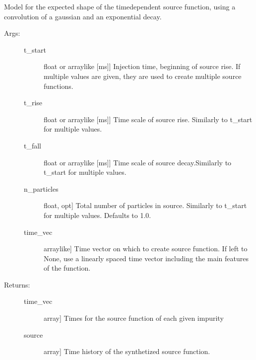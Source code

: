 \documentclass[letterpaper,10pt,english]{sphinxmanual}
\begin{document}
\begin{fulllineitems}
\label{\detokenize{aurora:aurora.source_utils.lbo_source_function}}
Model for the expected shape of the time\sphinxhyphen{}dependent source function,
using a convolution of a gaussian and an exponential decay.
\begin{description}
\item[{Args:}] \leavevmode\begin{description}
\item[{t\_start}] \leavevmode{[}float or array\sphinxhyphen{}like {[}ms{]}{]}
Injection time, beginning of source rise. If multiple values are given, they are
used to create multiple source functions.

\item[{t\_rise}] \leavevmode{[}float or array\sphinxhyphen{}like {[}ms{]}{]}
Time scale of source rise. Similarly to t\_start for multiple values.

\item[{t\_fall}] \leavevmode{[}float or array\sphinxhyphen{}like {[}ms{]}{]}
Time scale of source decay.Similarly to t\_start for multiple values.

\item[{n\_particles}] \leavevmode{[}float, opt{]}
Total number of particles in source. Similarly to t\_start for multiple values.
Defaults to 1.0.

\item[{time\_vec}] \leavevmode{[}array\sphinxhyphen{}like{]}
Time vector on which to create source function. If left to None,
use a linearly spaced time vector including the main features of the function.

\end{description}

\item[{Returns:}] \leavevmode\begin{description}
\item[{time\_vec}] \leavevmode{[}array{]}
Times for the source function of each given impurity

\item[{source}] \leavevmode{[}array{]}
Time history of the synthetized source function.

\end{description}

\end{description}

\end{fulllineitems}
\end{document}
